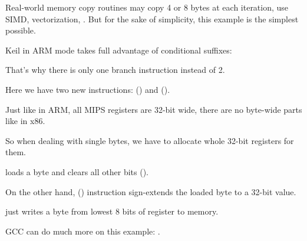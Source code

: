 ﻿
\label{loop_memcpy}

Real-world memory copy routines may copy 4 or 8 bytes at each iteration, use \ac{SIMD}, 
vectorization, \etc{}.
But for the sake of simplicity, this example is the simplest possible.











Keil in ARM mode takes full advantage of conditional suffixes:



That's why there is only one branch instruction instead of 2.





Here we have two new instructions:  () and  ().

Just like in ARM, all MIPS registers are 32-bit wide, there are no byte-wide parts like in x86.

So when dealing with single bytes, we have to allocate whole 32-bit registers for them.

 loads a byte and clears all other bits ().

On the other hand,  () instruction sign-extends the loaded byte to a 32-bit value.

 just writes a byte from lowest 8 bits of register to memory.


\Optimizing GCC can do much more on this example: .
